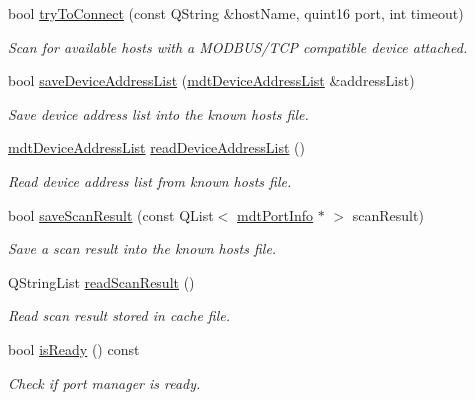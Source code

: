 \begin{DoxyCompactItemize}
bool \hyperlink{classmdt_modbus_tcp_port_manager_ab04f69b660487a7c59d309df7a8f5baa}{try\-To\-Connect} (const Q\-String \&host\-Name, quint16 port, int timeout)
\begin{DoxyCompactList}\small\item\em Scan for available hosts with a M\-O\-D\-B\-U\-S/\-T\-C\-P compatible device attached. \end{DoxyCompactList}\item 
bool \hyperlink{classmdt_modbus_tcp_port_manager_a1f8eb3874561f31e74a3355f4b1a6a8b}{save\-Device\-Address\-List} (\hyperlink{classmdt_device_address_list}{mdt\-Device\-Address\-List} \&address\-List)
\begin{DoxyCompactList}\small\item\em Save device address list into the known hosts file. \end{DoxyCompactList}\item 
\hyperlink{classmdt_device_address_list}{mdt\-Device\-Address\-List} \hyperlink{classmdt_modbus_tcp_port_manager_afe4db8318236242c3abd6752de2fcf38}{read\-Device\-Address\-List} ()
\begin{DoxyCompactList}\small\item\em Read device address list from known hosts file. \end{DoxyCompactList}\item 
bool \hyperlink{classmdt_modbus_tcp_port_manager_a3a1f5a54c93fa90ba83dea8785407da3}{save\-Scan\-Result} (const Q\-List$<$ \hyperlink{classmdt_port_info}{mdt\-Port\-Info} $\ast$ $>$ scan\-Result)
\begin{DoxyCompactList}\small\item\em Save a scan result into the known hosts file. \end{DoxyCompactList}\item 
Q\-String\-List \hyperlink{classmdt_modbus_tcp_port_manager_ab4d0a994973af6008faf489ca9ddb03d}{read\-Scan\-Result} ()
\begin{DoxyCompactList}\small\item\em Read scan result stored in cache file. \end{DoxyCompactList}\item 
bool \hyperlink{classmdt_modbus_tcp_port_manager_a5477eb7e8d57c5a42004046b426e39b6}{is\-Ready} () const 
\begin{DoxyCompactList}\small\item\em Check if port manager is ready. \end{DoxyCompactList}\item 

\end{DoxyCompactItemize}
